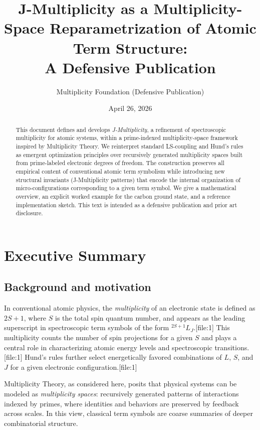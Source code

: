 \documentclass[11pt]{article}
\title{J-Multiplicity as a Multiplicity-Space Reparametrization of Atomic Term Structure:\\
A Defensive Publication}
\author{Multiplicity Foundation (Defensive Publication)}
\date{April 26, 2026}
\begin{document}
\maketitle

\begin{abstract}
This document defines and develops \emph{J-Multiplicity}, a refinement of spectroscopic multiplicity for atomic systems, within a prime-indexed multiplicity-space framework inspired by Multiplicity Theory. We reinterpret standard LS-coupling and Hund's rules as emergent optimization principles over recursively generated multiplicity spaces built from prime-labeled electronic degrees of freedom. The construction preserves all empirical content of conventional atomic term symbolism while introducing new structural invariants (J-Multiplicity patterns) that encode the internal organization of micro-configurations corresponding to a given term symbol. We give a mathematical overview, an explicit worked example for the carbon ground state, and a reference implementation sketch. This text is intended as a defensive publication and prior art disclosure.
\end{abstract}
\newpage
\tableofcontents
\newpage
\section{Executive Summary}

\subsection{Background and motivation}

In conventional atomic physics, the \emph{multiplicity} of an electronic state is defined as \(2S+1\), where \(S\) is the total spin quantum number, and appears as the leading superscript in spectroscopic term symbols of the form \(^{2S+1}L_J\).[file:1] This multiplicity counts the number of spin projections for a given \(S\) and plays a central role in characterizing atomic energy levels and spectroscopic transitions.[file:1] Hund's rules further select energetically favored combinations of \(L\), \(S\), and \(J\) for a given electronic configuration.[file:1]

Multiplicity Theory, as considered here, posits that physical systems can be modeled as \emph{multiplicity spaces}: recursively generated patterns of interactions indexed by primes, where identities and behaviors are preserved by feedback across scales. In this view, classical term symbols are coarse summaries of deeper combinatorial structure.
\end{document}
